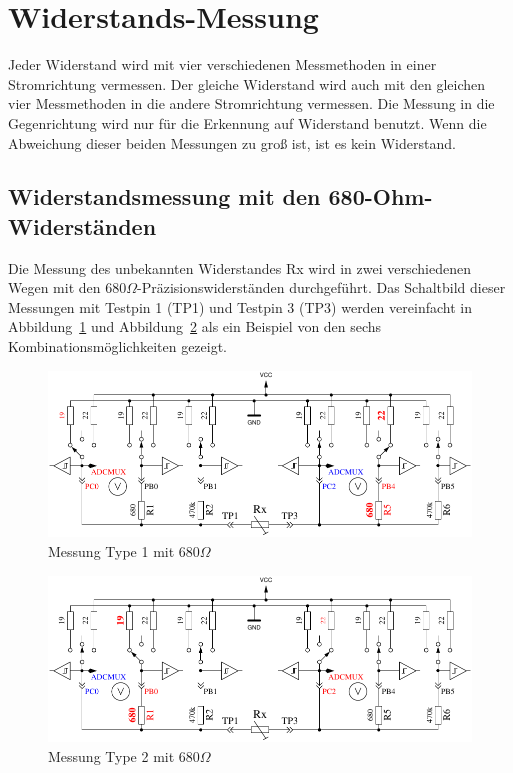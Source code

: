 \section{Widerstands-Messung}
Jeder Widerstand wird mit vier verschiedenen Messmethoden in einer Stromrichtung vermessen.
Der gleiche Widerstand wird auch mit den gleichen vier Messmethoden in die andere Stromrichtung vermessen.
Die Messung in die Gegenrichtung wird nur für die Erkennung auf Widerstand benutzt.
Wenn die Abweichung dieser beiden Messungen zu groß ist, ist es kein Widerstand.

\subsection{Widerstandsmessung mit den 680-Ohm-Widerständen}
Die Messung des unbekannten Widerstandes Rx wird in zwei verschiedenen Wegen mit den \(680\Omega\)-Präzisionswiderständen
 durchgeführt.
Das Schaltbild dieser Messungen mit Testpin 1 (TP1) und Testpin 3 (TP3) werden vereinfacht in Abbildung~\ref{fig:RL1mes} und Abbildung~\ref{fig:RL2mes} als ein Beispiel von den sechs Kombinationsmöglichkeiten gezeigt.

\begin{figure}[H]
\centering
\includegraphics[]{../FIG/ResistormessL1.pdf}
\caption{Messung Type 1 mit \(680\Omega\) }
\label{fig:RL1mes}
\end{figure}

\begin{figure}[H]
 \centering
 \includegraphics[]{../FIG/ResistormessL2.pdf}
 \caption{Messung Type 2 mit \(680\Omega\) }
\label{fig:RL2mes}
\end{figure}

